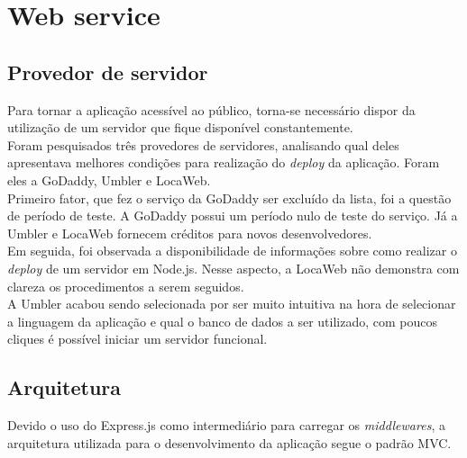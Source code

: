 \documentclass[
	12pt,				%
	oneside,			%
	a4paper,			%
	brazil				%
]{abntex2}
\begin{document}
{\section{Web service}

\subsection{Provedor de servidor}

Para tornar a aplicação acessível ao público, torna-se necessário dispor da utilização de um servidor que fique disponível constantemente. \\
Foram pesquisados três provedores de servidores, analisando qual deles apresentava melhores condições para realização do \textit{deploy} da aplicação. Foram eles a GoDaddy, Umbler e LocaWeb.\\
Primeiro fator, que fez o serviço da GoDaddy ser excluído da lista, foi a questão de período de teste. A GoDaddy possui um período nulo de teste do serviço. Já a Umbler e LocaWeb fornecem créditos para novos desenvolvedores.\\
Em seguida, foi observada a disponibilidade de informações sobre como realizar o \textit{deploy} de um servidor em Node.js. Nesse aspecto, a LocaWeb não demonstra com clareza os procedimentos a serem seguidos.\\
A Umbler acabou sendo selecionada por ser muito intuitiva na hora de selecionar a linguagem da aplicação e qual o banco de dados a ser utilizado, com poucos cliques é possível iniciar um servidor funcional.


\subsection{Arquitetura}

Devido o uso do Express.js como intermediário para carregar os \textit{middlewares}, a arquitetura utilizada para o desenvolvimento da aplicação segue o padrão MVC.

}
\end{document}
